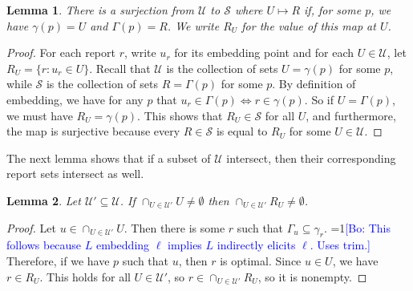 \documentclass{article}
\newcommand{\Comments}{1}
\newcommand{\mynote}[2]{\ifnum\Comments=1\textcolor{#1}{#2}\fi}
\newcommand{\bo}[1]{\mynote{blue}{[Bo: #1]}}
\newtheorem{lemma}{Lemma}
\theoremstyle{definition}
\begin{document}
\begin{lemma} \label{lemma:U-surject}
  There is a surjection from $\mathcal{U}$ to $\mathcal{S}$ where $U \mapsto R$ if, for some $p$, we have $\gamma(p) = U$ and $\Gamma(p) = R$.
  We write $R_U$ for the value of this map at $U$.
\end{lemma}
\begin{proof}
  For each report $r$, write $u_r$ for its embedding point and for each $U \in \mathcal{U}$, let $R_U = \{r : u_r \in U\}$.
  Recall that $\mathcal{U}$ is the collection of sets $U = \gamma(p)$ for some $p$, while $\mathcal{S}$ is the collection of sets $R = \Gamma(p)$ for some $p$.
  By definition of embedding, we have for any $p$ that $u_r \in \Gamma(p) \iff r \in \gamma(p)$.
  So if $U = \Gamma(p)$, we must have $R_U = \gamma(p)$.
  This shows that $R_U \in \mathcal{S}$ for all $U$, and furthermore, the map is surjective because every $R \in \mathcal{S}$ is equal to $R_U$ for some $U \in \mathcal{U}$.
\end{proof}

The next lemma shows that if a subset of $\mathcal{U}$ intersect, then their corresponding report sets intersect as well.
\begin{lemma} \label{lemma:calibrated-pos}
  Let $\mathcal{U}' \subseteq \mathcal{U}$.
  If $\cap_{U\in\mathcal{U}'} U \neq \emptyset$ then $\cap_{U\in\mathcal{U}'} R_U \neq \emptyset$.
\end{lemma}
\begin{proof}
  Let $u \in \cap_{U\in\mathcal{U}'} U$.
  Then there is some $r$ such that $\Gamma_u \subseteq \gamma_r$. \bo{This follows because $L$ embedding $\ell$ implies $L$ indirectly elicits $\ell$. Uses trim.}
  Therefore, if we have $p$ such that $u$, then $r$ is optimal.
  Since $u \in U$, we have $r \in R_U$.
  This holds for all $U \in \mathcal{U}'$, so $r \in \cap_{U\in\mathcal{U}'} R_U$, so it is nonempty.
\end{proof}

%
\end{document}
